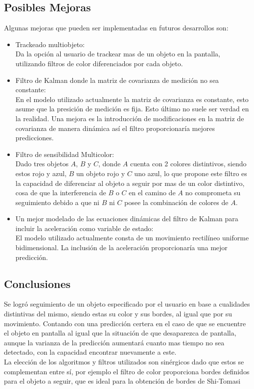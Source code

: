 \subsection{Posibles Mejoras}
Algunas mejoras que pueden ser implementadas en futuros desarrollos son:
\begin{itemize}
\item Trackeado multiobjeto: \\
Da la opción al usuario de trackear mas de un objeto en la pantalla, utilizando filtros de color diferenciados por cada objeto.
\item Filtro de Kalman donde la matriz de covarianza de medición no sea constante: \\
En el modelo utilizado actualmente la matriz de covarianza es constante, esto asume que la presición de  medición es fija. Esto último no suele ser verdad en la realidad. Una mejora es la introducción de modificaciones en la matriz de covarianza de manera dinámica así el filtro proporcionaría mejores predicciones. 





\item Filtro de sensibilidad Multicolor: \\
Dado tres objetos $A$, $B$ y $C$, donde $A$ cuenta con 2 colores distintivos, siendo estos rojo y azul, $B$ un objeto rojo y $C$ uno azul, lo que propone este filtro es la capacidad de diferenciar al objeto a seguir por mas de un color distintivo, cosa de que la interferencia de $B$ o $C$ en el camino de $A$ no comprometa su seguimiento debido a que ni $B$ ni $C$ posee la combinación de colores de $A$.
\item Un mejor modelado de las ecuaciones dinámicas del filtro de Kalman para incluir la aceleración como variable de estado: \\
El modelo utilizado actualmente consta de un movimiento rectilíneo uniforme bidimensional. La inclusión de la aceleración proporcionaría una mejor predicción.
\end{itemize}




\subsection{Conclusiones}
Se logró seguimiento de un objeto especificado por el usuario en base a cualidades distintivas del mismo, siendo estas su color y sus bordes, al igual que por su movimiento. Contando con una predicción certera en el caso de que se encuentre el objeto en pantalla al igual que la situación de que desaparezca de pantalla, aunque la varianza de la predicción aumentará cuanto mas tiempo no sea detectado, con la capacidad encontrar nuevamente a este.\\
La elección de los algoritmos y filtros utilizados son sinérgicos dado que estos se complementan entre sí, por ejemplo el filtro de color proporciona bordes definidos para el objeto a seguir, que es ideal para la obtención de bordes de Shi-Tomasi

